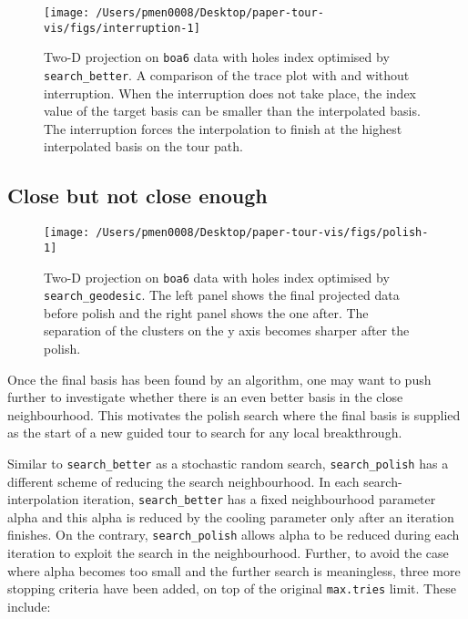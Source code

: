 \documentclass[12pt]{article}
\begin{document}
\begin{figure}

{\centering \texttt{[image: /Users/pmen0008/Desktop/paper-tour-vis/figs/interruption-1]} 

}

\caption{Two-D projection on \texttt{boa6} data with holes index optimised by \texttt{search\_better}. A comparison of the trace plot with and without interruption. When the interruption does not take place, the index value of the target basis can be smaller than the interpolated basis. The interruption forces the interpolation to finish at the highest interpolated basis on the tour path.}\label{fig:interruption}
\end{figure}



\hypertarget{close-but-not-close-enough}{%
\subsection{Close but not close enough}\label{close-but-not-close-enough}}

\begin{figure}

{\centering \texttt{[image: /Users/pmen0008/Desktop/paper-tour-vis/figs/polish-1]} 

}

\caption{Two-D projection on \texttt{boa6} data with holes index optimised by \texttt{search\_geodesic}. The left panel shows the final projected data before polish and the right panel shows the one after. The separation of the clusters on the y axis becomes sharper after the polish.}\label{fig:polish}
\end{figure}



Once the final basis has been found by an algorithm, one may want to push further to investigate whether there is an even better basis in the close neighbourhood. This motivates the polish search where the final basis is supplied as the start of a new guided tour to search for any local breakthrough.

Similar to \texttt{search\_better} as a stochastic random search, \texttt{search\_polish} has a different scheme of reducing the search neighbourhood. In each search-interpolation iteration, \texttt{search\_better} has a fixed neighbourhood parameter alpha and this alpha is reduced by the cooling parameter only after an iteration finishes. On the contrary, \texttt{search\_polish} allows alpha to be reduced during each iteration to exploit the search in the neighbourhood. Further, to avoid the case where alpha becomes too small and the further search is meaningless, three more stopping criteria have been added, on top of the original \texttt{max.tries} limit. These include:
\end{document}
